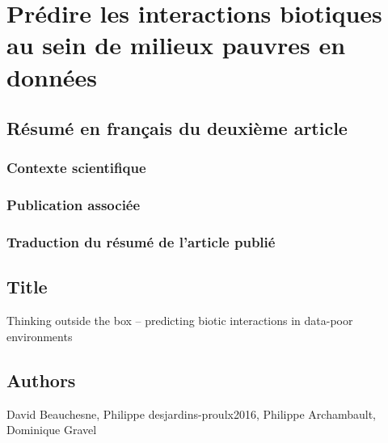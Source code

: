 \chapter{Prédire les interactions biotiques au sein de milieux pauvres en données}
\label{chap3}

\section{Résumé en français du deuxième article}

\subsection{Contexte scientifique}

\subsection{Publication associée}

\subsection{Traduction du résumé de l'article publié}

\section{Title}

Thinking outside the box – predicting biotic interactions in data-poor environments

\section{Authors}

David Beauchesne, Philippe desjardins-proulx2016, Philippe Archambault, Dominique Gravel

